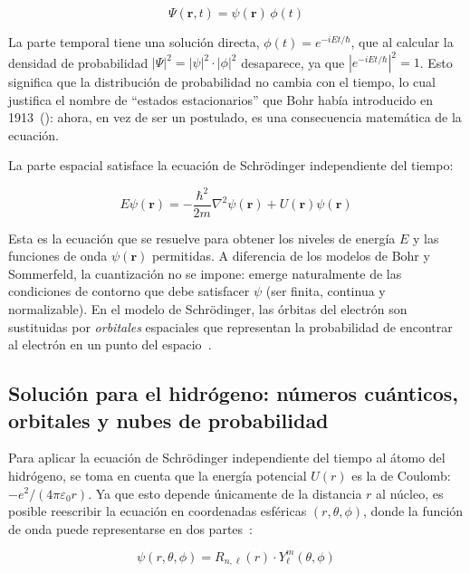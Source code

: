 \documentclass[11pt,a4paper,spanish]{book}
\begin{document}
\begin{equation}
  \Psi(\mathbf{r},t) = \psi(\mathbf{r})\,\phi(t)
  \label{eq:separacion}
\end{equation}

La parte temporal tiene una solución directa, \(\phi(t) =
e^{-iEt/\hbar}\), que al calcular la densidad de probabilidad
\(|\Psi|^2 = |\psi|^2 \cdot |\phi|^2\) desaparece, ya que
\(|e^{-iEt/\hbar}|^2 = 1\). Esto significa que la distribución de
probabilidad no cambia con el tiempo, lo cual justifica el nombre de
``estados estacionarios'' que Bohr había introducido en
1913~(\citeyear{bohr1913}): ahora, en vez de ser un postulado, es una
consecuencia matemática de la ecuación.

\noindent La parte espacial satisface la ecuación de Schrödinger
independiente del tiempo:

\begin{equation}
  E\psi(\mathbf{r}) = -\frac{\hbar^2}{2m}\nabla^2\psi(\mathbf{r}) +
  U(\mathbf{r})\psi(\mathbf{r})
  \label{eq:schrodinger_ti}
\end{equation}

Esta es la ecuación que se resuelve para obtener los niveles de
energía \(E\) y las funciones de onda \(\psi(\mathbf{r})\)
permitidas. A diferencia de los modelos de Bohr y Sommerfeld, la
cuantización no se impone: emerge naturalmente de las condiciones de
contorno que debe satisfacer \(\psi\) (ser finita, continua y
normalizable). En el modelo de Schrödinger, las órbitas del electrón
son sustituidas por \textit{orbitales} espaciales que representan la
probabilidad de encontrar al electrón en un punto del
espacio~\citep{schrodinger1926}.

\subsection{Solución para el hidrógeno: números cuánticos, orbitales
y nubes de probabilidad}

Para aplicar la ecuación de Schrödinger independiente del tiempo al
átomo del hidrógeno, se toma en
cuenta que la energía potencial \(U(r)\) es la de Coulomb:
\(-e^2/(4\pi\varepsilon_0 r)\). Ya que esto depende únicamente de la
distancia \(r\) al núcleo, es posible reescribir la ecuación en coordenadas
esféricas \((r, \theta, \phi)\), donde la función de onda puede
representarse en dos partes~\citep{schrodinger1926}:

\begin{equation}
  \psi(r,\theta,\phi) = R_{n,\ell}(r) \cdot Y_\ell^{m}(\theta,\phi)
  \label{eq:separacion_esferica}
\end{equation}
\end{document}
